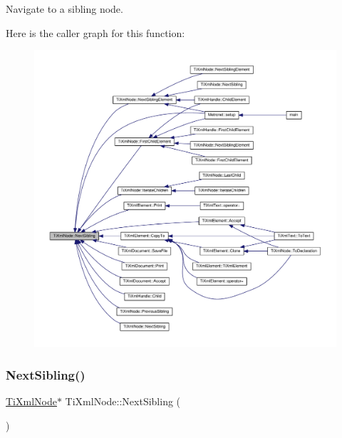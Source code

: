 Navigate to a sibling node. 

Here is the caller graph for this function\+:\nopagebreak
\begin{figure}[H]
\begin{center}
\leavevmode
\includegraphics[width=350pt]{class_ti_xml_node_ae99c572ac7901a15993ea7a4efaa10e7_icgraph}
\end{center}
\end{figure}
\mbox{\label{class_ti_xml_node_a4d05f7b1d7b470ac6887edd072d4892a}} 
\subsubsection{\texorpdfstring{Next\+Sibling()}{NextSibling()}\hspace{0.1cm}{\footnotesize\ttfamily [2/4]}}
{\footnotesize\ttfamily \hyperlink{class_ti_xml_node}{Ti\+Xml\+Node}$\ast$ Ti\+Xml\+Node\+::\+Next\+Sibling (\begin{DoxyParamCaption}{ }\end{DoxyParamCaption})\hspace{0.3cm}{\ttfamily [inline]}}

